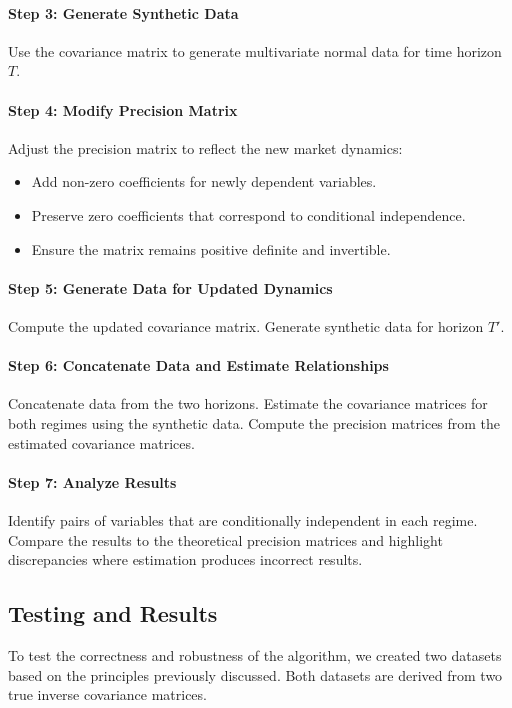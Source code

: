 \documentclass{article}
\begin{document}
\paragraph{Step 3: Generate Synthetic Data}
Use the covariance matrix to generate multivariate normal data for time horizon $T$.

\paragraph{Step 4: Modify Precision Matrix}
Adjust the precision matrix to reflect the new market dynamics:
\begin{itemize}
    \item Add non-zero coefficients for newly dependent variables.
    \item Preserve zero coefficients that correspond to conditional independence.
    \item Ensure the matrix remains positive definite and invertible.
\end{itemize}

\paragraph{Step 5: Generate Data for Updated Dynamics}
Compute the updated covariance matrix. Generate synthetic data for horizon $T'$.

\paragraph{Step 6: Concatenate Data and Estimate Relationships}
Concatenate data from the two horizons. Estimate the covariance matrices for both regimes using the synthetic data. Compute the precision matrices from the estimated covariance matrices.

\paragraph{Step 7: Analyze Results}
Identify pairs of variables that are conditionally independent in each regime. Compare the results to the theoretical precision matrices and highlight discrepancies where estimation produces incorrect results.

\subsection{Testing and Results}

To test the correctness and robustness of the algorithm, we created two datasets based on the principles previously discussed. Both datasets are derived from two true inverse covariance matrices.
\end{document}
